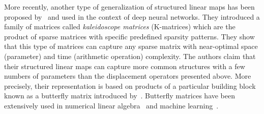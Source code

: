 More recently, another type of generalization of structured linear maps has been proposed by~\citet{dao2019learning,dao2020kaleidoscope} and used in the context of deep neural networks.
They introduced a family of matrices called \emph{kaleidoscope matrices} (K-matrices) which are the product of sparse matrices with specific predefined sparsity patterns.
They show that this type of matrices can capture any sparse matrix with near-optimal space (parameter) and time (arithmetic operation) complexity.
The authors claim that their structured linear maps can capture more common structures with a few numbers of parameters than the displacement operators presented above.
More precisely, their representation is based on products of a particular building block known as a butterfly matrix introduced by~\citet{parker1995random}.
Butterfly matrices have been extensively used in numerical linear algebra~\cite{parker1995random,li2015butterfly} and machine learning~\cite{mathieu2014fast,jing2017tunable,munkhoeva2018quadrature,dao2019learning,choromanski2019unifying}.







%



